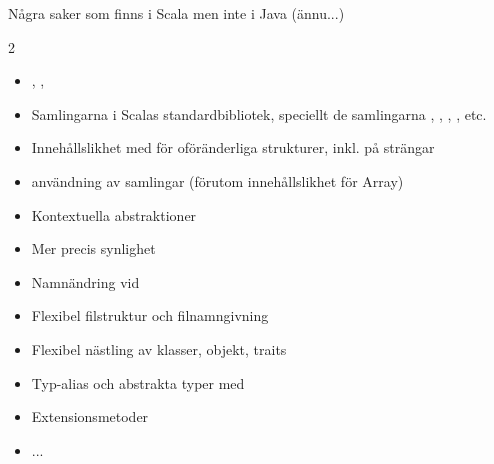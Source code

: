 \begin{Slide}{Några saker som finns i Scala men inte i Java (ännu...)}
\begin{multicols}{2}
\begin{itemize}
\item {}, , 

\item Samlingarna i Scalas standardbibliotek, speciellt de  samlingarna , , , , etc.

\item Innehållslikhet med \code{==} för oföränderliga strukturer, inkl. \code{< <= > >= } på strängar

\item {} användning av samlingar  (förutom innehållslikhet för Array)

\item Kontextuella abstraktioner  

\item Mer precis synlighet 

\item Namnändring vid 

\item Flexibel filstruktur och filnamngivning

\item Flexibel nästling av klasser, objekt, traits

\item Typ-alias och abstrakta typer med 

\item Extensionsmetoder 

\item ...
\end{itemize}
\ifkompendium\else
\end{multicols}
\fi
\end{Slide}




